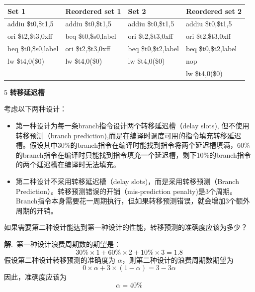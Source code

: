 \documentclass[12pt,a4paper]{article}
\newenvironment{problems}{\begin{list}{}{\renewcommand{\makelabel}[1]{\textbf{##1}.\hfil}}}{\end{list}}
\providecommand{\sol}{\textbf{解}.~}
\begin{document}
\begin{problems}
    \begin{tabular}{>{\ttfamily}l>{\ttfamily}l|>{\ttfamily}l>{\ttfamily}l}
        \bfseries Set 1 &\bfseries Reordered set 1 &\bfseries Set 2 &\bfseries Reordered set 2\\
        \hline
        addiu \$t0,\$t1,5 &  addiu \$t0,\$t1,5  & addiu \$t0,\$t1,5 & addiu \$t0,\$t1,5\\
        ori \$t2,\$t3,0xff & beq \$t0,\$s0,label & ori \$t2,\$t3,0xff & ori \$t2,\$t3,0xff\\
        beq \$t0,\$s0,label & ori \$t2,\$t3,0xff  & beq \$t0,\$t2,label & beq \$t0,\$t2,label \\
        lw \$t4,0(\$0) & lw \$t4,0(\$0) & lw \$t4,0(\$0) & nop\\
         & & &  lw \$t4,0(\$0)\\
    \end{tabular}

    \item[5] \textbf{转移延迟槽}
    
    考虑以下两种设计：
    \begin{itemize}
        \item 第一种设计为每一条branch指令设计两个转移延迟槽（delay slots), 但不使用转移预测（branch prediction),而是在编译时调度可用的指令填充转移延迟槽。假设其中30\%的branch指令在编译时能找到指令将两个延迟槽填满，60\%的branch指令在编译时只能找到指令填充一个延迟槽，剩下10\%的branch指令的两个延迟槽在编译时无法填充。
        \item 第二种设计不采用转移延迟槽（delay slots)，而是采用转移预测（Branch Prediction）。转移预测错误的开销（mis-prediction penalty)是3个周期。Branch指令本身需要花一周期执行，但如果转移预测错误，就会增加3个额外周期的开销。
    \end{itemize}

    如果需要第二种设计能达到第一种设计的性能，转移预测的准确度应该为多少？

    \sol 第一种设计浪费周期数的期望是：
    \begin{equation}
        30\% \times 1 + 60\% \times 2 + 10\% \times 3 = 1.8
    \end{equation}
    假设第二种设计转移预测的准确度为 $\alpha$，则第二种设计的浪费周期数期望为
    \begin{equation}
        0 \times \alpha + 3\times (1-\alpha) = 3 - 3\alpha
    \end{equation}
    因此，准确度应该为
    \begin{equation}
        \alpha = 40\%
    \end{equation}


\end{problems}
\end{document}
